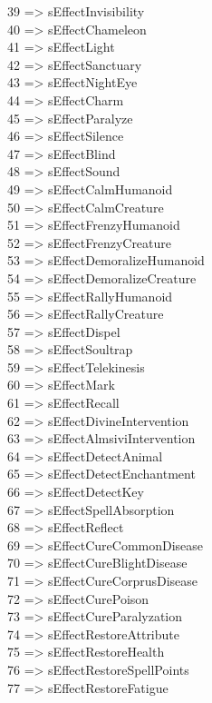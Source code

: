 39 => sEffectInvisibility\\
40 => sEffectChameleon\\
41 => sEffectLight\\
42 => sEffectSanctuary\\
43 => sEffectNightEye\\
44 => sEffectCharm\\
45 => sEffectParalyze\\
46 => sEffectSilence\\
47 => sEffectBlind\\
48 => sEffectSound\\
49 => sEffectCalmHumanoid\\
50 => sEffectCalmCreature\\
51 => sEffectFrenzyHumanoid\\
52 => sEffectFrenzyCreature\\
53 => sEffectDemoralizeHumanoid\\
54 => sEffectDemoralizeCreature\\
55 => sEffectRallyHumanoid\\
56 => sEffectRallyCreature\\
57 => sEffectDispel\\
58 => sEffectSoultrap\\
59 => sEffectTelekinesis\\
60 => sEffectMark\\
61 => sEffectRecall\\
62 => sEffectDivineIntervention\\
63 => sEffectAlmsiviIntervention\\
64 => sEffectDetectAnimal\\
65 => sEffectDetectEnchantment\\
66 => sEffectDetectKey\\
67 => sEffectSpellAbsorption\\
68 => sEffectReflect\\
69 => sEffectCureCommonDisease\\
70 => sEffectCureBlightDisease\\
71 => sEffectCureCorprusDisease\\
72 => sEffectCurePoison\\
73 => sEffectCureParalyzation\\
74 => sEffectRestoreAttribute\\
75 => sEffectRestoreHealth\\
76 => sEffectRestoreSpellPoints\\
77 => sEffectRestoreFatigue\\
